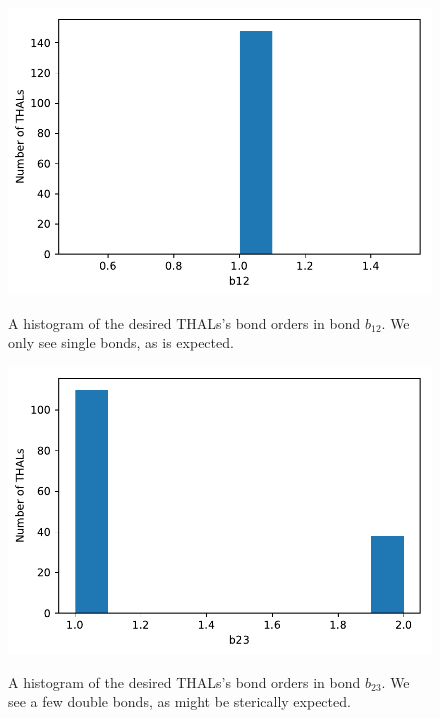 \begin{figure}[ht] 
	\begin{minipage}[b]{0.5\linewidth}
		\centering
		\includegraphics[width=.9\linewidth]{img/thal_ss_hist_b12.pdf} 
		\caption{A histogram of the desired THALs's bond orders in bond $b_{12}$. We only see single bonds, as is expected.} 
		\label{fig:thalhist_b12}
		\vspace{4ex}
	\end{minipage}%
	\begin{minipage}[b]{0.5\linewidth}
		\centering
		\includegraphics[width=.9\linewidth]{img/thal_ss_hist_b23.pdf} 
		\caption{A histogram of the desired THALs's bond orders in bond $b_{23}$. We see a few double bonds, as might be sterically expected.} 
		\vspace{4ex}
		\label{fig:thalhist_b23}
	\end{minipage}
		\begin{minipage}[b]{0.5\linewidth}
			\centering

\end{minipage}
\end{figure}
